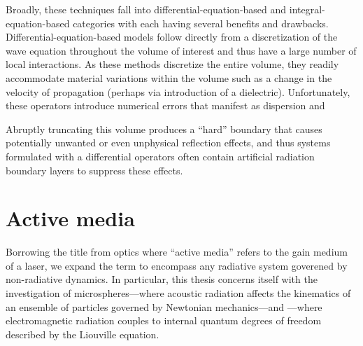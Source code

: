 Broadly, these techniques fall into differential-equation-based and integral-equation-based categories with each having several benefits and drawbacks.
Differential-equation-based models follow directly from a discretization of the wave equation throughout the volume of interest and thus have a large number of local interactions.
As these methods discretize the entire volume, they readily accommodate material variations within the volume such as a change in the velocity of propagation (perhaps via introduction of a dielectric).
Unfortunately, these operators introduce numerical errors that manifest as dispersion and

Abruptly truncating this volume produces a ``hard'' boundary that causes potentially unwanted or even unphysical reflection effects, and thus systems formulated with a differential operators often contain artificial radiation boundary layers to suppress these effects.

\section{Active media}

Borrowing the title from optics where ``active media'' refers to the gain medium of a laser, we expand the term to encompass any radiative system goverened by non-radiative dynamics.
In particular, this thesis concerns itself with the investigation of microspheres---where acoustic radiation affects the kinematics of an ensemble of particles governed by Newtonian mechanics---and \qds{}---where electromagnetic radiation couples to internal quantum degrees of freedom described by the Liouville equation.









